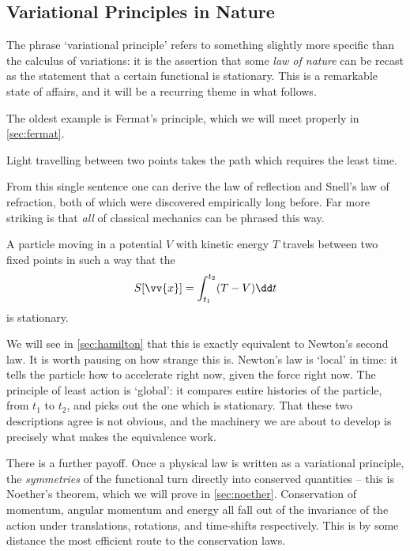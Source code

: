 \subsection{Variational Principles in Nature}

The phrase `variational principle' refers to something slightly more specific than the calculus of variations: it is the assertion that some \emph{law of nature} can be recast as the statement that a certain functional is stationary. This is a remarkable state of affairs, and it will be a recurring theme in what follows.

The oldest example is Fermat's principle, which we will meet properly in \autoref{sec:fermat}.

\begin{law}
	Light travelling between two points takes the path which requires the least time.
\end{law}

From this single sentence one can derive the law of reflection and Snell's law of refraction, both of which were discovered empirically long before. Far more striking is that \emph{all} of classical mechanics can be phrased this way.

\begin{law}
	A particle moving in a potential $V$ with kinetic energy $T$ travels between two fixed points in such a way that the 
	$$
	S[\vv{x}] = \int_{t_1}^{t_2} (T - V) \dd t
	$$
	is stationary.
\end{law}

We will see in \autoref{sec:hamilton} that this is exactly equivalent to Newton's second law. It is worth pausing on how strange this is. Newton's law is `local' in time: it tells the particle how to accelerate right now, given the force right now. The principle of least action is `global': it compares entire histories of the particle, from $t_1$ to $t_2$, and picks out the one which is stationary. That these two descriptions agree is not obvious, and the machinery we are about to develop is precisely what makes the equivalence work.

There is a further payoff. Once a physical law is written as a variational principle, the \emph{symmetries} of the functional turn directly into conserved quantities -- this is Noether's theorem, which we will prove in \autoref{sec:noether}. Conservation of momentum, angular momentum and energy all fall out of the invariance of the action under translations, rotations, and time-shifts respectively. This is by some distance the most efficient route to the conservation laws.

